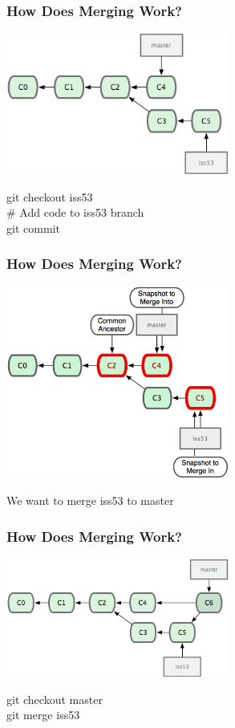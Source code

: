 \begin{frame}
\frametitle{\large How Does Merging Work?}
\begin{center}
\includegraphics[width=0.55\textwidth]{img/branching_images/f6.png}
\end{center}
\vspace{2mm}
\begin{center}
git checkout iss53 \\
\# Add code to iss53 branch \\
git commit
\end{center}
\end{frame}

\begin{frame}
\frametitle{\large How Does Merging Work?}
\begin{center}
\includegraphics[width=0.55\textwidth]{img/branching_images/f7.png}
\end{center}
\vspace{2mm}
\begin{center}
We want to merge iss53 to master
\end{center}
\end{frame}

\begin{frame}
\frametitle{\large How Does Merging Work?}
\begin{center}
\includegraphics[width=0.55\textwidth]{img/branching_images/f8.png}
\end{center}
\vspace{2mm}
\begin{center}
git checkout master \\
git merge iss53
\end{center}
\end{frame}


